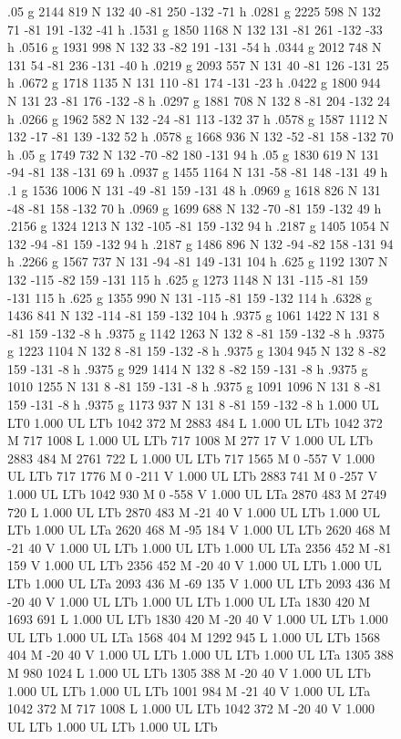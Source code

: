 \documentclass{LMCS}
\begin{document}
\begin{figure}[!tbp]
{{{.05 g 2144 819 N 132 40 -81 250 -132 -71 h
.0281 g 2225 598 N 132 71 -81 191 -132 -41 h
.1531 g 1850 1168 N 132 131 -81 261 -132 -33 h
.0516 g 1931 998 N 132 33 -82 191 -131 -54 h
.0344 g 2012 748 N 131 54 -81 236 -131 -40 h
.0219 g 2093 557 N 131 40 -81 126 -131 25 h
.0672 g 1718 1135 N 131 110 -81 174 -131 -23 h
.0422 g 1800 944 N 131 23 -81 176 -132 -8 h
.0297 g 1881 708 N 132 8 -81 204 -132 24 h
.0266 g 1962 582 N 132 -24 -81 113 -132 37 h
.0578 g 1587 1112 N 132 -17 -81 139 -132 52 h
.0578 g 1668 936 N 132 -52 -81 158 -132 70 h
.05 g 1749 732 N 132 -70 -82 180 -131 94 h
.05 g 1830 619 N 131 -94 -81 138 -131 69 h
.0937 g 1455 1164 N 131 -58 -81 148 -131 49 h
.1 g 1536 1006 N 131 -49 -81 159 -131 48 h
.0969 g 1618 826 N 131 -48 -81 158 -132 70 h
.0969 g 1699 688 N 132 -70 -81 159 -132 49 h
.2156 g 1324 1213 N 132 -105 -81 159 -132 94 h
.2187 g 1405 1054 N 132 -94 -81 159 -132 94 h
.2187 g 1486 896 N 132 -94 -82 158 -131 94 h
.2266 g 1567 737 N 131 -94 -81 149 -131 104 h
.625 g 1192 1307 N 132 -115 -82 159 -131 115 h
.625 g 1273 1148 N 131 -115 -81 159 -131 115 h
.625 g 1355 990 N 131 -115 -81 159 -132 114 h
.6328 g 1436 841 N 132 -114 -81 159 -132 104 h
.9375 g 1061 1422 N 131 8 -81 159 -132 -8 h
.9375 g 1142 1263 N 132 8 -81 159 -132 -8 h
.9375 g 1223 1104 N 132 8 -81 159 -132 -8 h
.9375 g 1304 945 N 132 8 -82 159 -131 -8 h
.9375 g 929 1414 N 132 8 -82 159 -131 -8 h
.9375 g 1010 1255 N 131 8 -81 159 -131 -8 h
.9375 g 1091 1096 N 131 8 -81 159 -131 -8 h
.9375 g 1173 937 N 131 8 -81 159 -132 -8 h
1.000 UL
LT0
1.000 UL
LTb
1042 372 M
2883 484 L
1.000 UL
LTb
1042 372 M
717 1008 L
1.000 UL
LTb
717 1008 M
277 17 V
1.000 UL
LTb
2883 484 M
2761 722 L
1.000 UL
LTb
717 1565 M
0 -557 V
1.000 UL
LTb
717 1776 M
0 -211 V
1.000 UL
LTb
2883 741 M
0 -257 V
1.000 UL
LTb
1042 930 M
0 -558 V
1.000 UL
LTa
2870 483 M
2749 720 L
1.000 UL
LTb
2870 483 M
-21 40 V
1.000 UL
LTb
1.000 UL
LTb
1.000 UL
LTa
2620 468 M
-95 184 V
1.000 UL
LTb
2620 468 M
-21 40 V
1.000 UL
LTb
1.000 UL
LTb
1.000 UL
LTa
2356 452 M
-81 159 V
1.000 UL
LTb
2356 452 M
-20 40 V
1.000 UL
LTb
1.000 UL
LTb
1.000 UL
LTa
2093 436 M
-69 135 V
1.000 UL
LTb
2093 436 M
-20 40 V
1.000 UL
LTb
1.000 UL
LTb
1.000 UL
LTa
1830 420 M
1693 691 L
1.000 UL
LTb
1830 420 M
-20 40 V
1.000 UL
LTb
1.000 UL
LTb
1.000 UL
LTa
1568 404 M
1292 945 L
1.000 UL
LTb
1568 404 M
-20 40 V
1.000 UL
LTb
1.000 UL
LTb
1.000 UL
LTa
1305 388 M
980 1024 L
1.000 UL
LTb
1305 388 M
-20 40 V
1.000 UL
LTb
1.000 UL
LTb
1.000 UL
LTb
1001 984 M
-21 40 V
1.000 UL
LTa
1042 372 M
717 1008 L
1.000 UL
LTb
1042 372 M
-20 40 V
1.000 UL
LTb
1.000 UL
LTb
1.000 UL
LTb
}}}
\end{figure}
\end{document}
